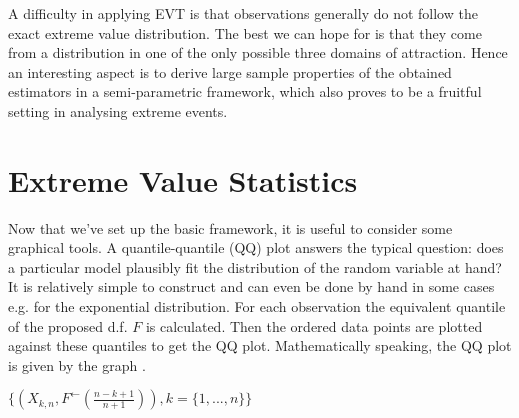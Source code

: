 
A difficulty in applying EVT is that observations generally do not follow the exact extreme value distribution. The best we can hope for is that they come from a distribution in one of the only possible three domains of attraction. Hence an interesting aspect is to derive large sample properties of the obtained estimators in a %
semi-parametric framework, which also proves to be a  fruitful setting in analysing extreme events. 


\section{Extreme Value Statistics} \label{subsec:EVres}

Now that we've set up the basic framework, it is useful to consider some graphical tools. A quantile-quantile (QQ) plot answers the typical question: does a particular model plausibly fit the distribution of the random variable at hand? It is relatively simple to construct and can even be done by hand in some cases e.g. for the exponential distribution. For each observation the equivalent quantile of the proposed d.f. $F$ is calculated. Then the ordered data points are plotted against these quantiles to get the QQ plot. Mathematically speaking, the QQ plot is given by the graph \cite[ch.~6]{embrechts}. \newline

\centerline{$\{(X_{k,n},F^{\leftarrow}(\frac{n-k+1}{n+1})), k = \{1,...,n\}\}$}

